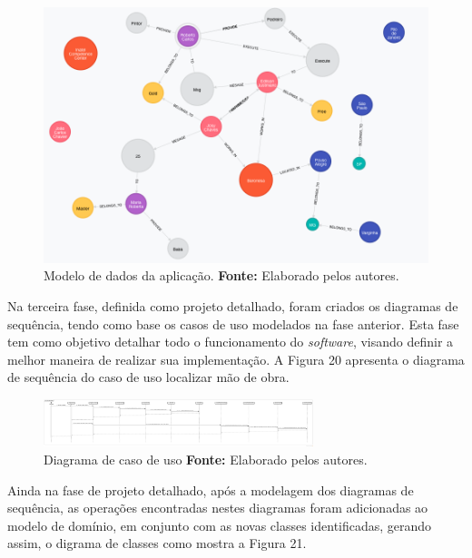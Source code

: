 \begin{figure}[h!]
	\centerline{\includegraphics[scale=0.5]{./imagens/structure-all-nodes.png}}
	\caption[Modelo de dados da aplicação]
	{Modelo de dados da aplicação. \textbf{Fonte:} Elaborado pelos autores.}
	\label{fig:exemplo1}
\end{figure} 


\par Na terceira fase, definida como projeto detalhado, foram criados os diagramas de sequência, tendo como base os casos de uso modelados na fase anterior. Esta fase tem como objetivo detalhar todo o funcionamento do \textit{software}, visando definir a melhor maneira de realizar sua implementação. A Figura 20 apresenta o diagrama de sequência do caso de uso localizar mão de obra.

\newpage
\begin{figure}[h!]
	\centerline{\includegraphics[angle=90,height=0.7\textheight,width=0.7\textwidth]{./imagens/sequence-localizar-mao-de-obra.png}}
	\caption[Diagrama de caso de uso]
	{Diagrama de caso de uso \textbf{Fonte:} Elaborado pelos autores.}
	\label{fig:exemplo1}
\end{figure}

\par Ainda na fase de projeto detalhado, após a modelagem dos diagramas de sequência, as operações encontradas nestes diagramas foram adicionadas ao modelo de domínio, em conjunto com as novas classes identificadas, gerando assim, o digrama de classes como mostra a Figura 21.

